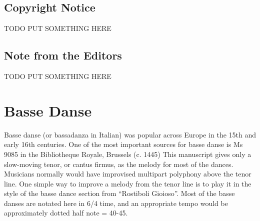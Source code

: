 \documentclass[11pt]{book}
\begin{document}
\frontmatter

\pagestyle{fancy}

\fancyhf{}

\fancyhead[LE,RO]{\thepage}
\renewcommand{\headrulewidth}{0pt}
\renewcommand{\footrulewidth}{0pt}
\setlength{\parindent}{0pt}

%
%
%
%
%
%

\section*{Copyright Notice}

TODO PUT SOMETHING HERE
\clearpage

\section*{Note from the Editors}

TODO PUT SOMETHING HERE

\begin{multicols}{2}

\renewcommand\cftchapafterpnum{\vskip\baselineskip}
\setlength{\cftsubsecindent}{0pt}
\setlength{\cftsubsecnumwidth}{0pt}
\tableofcontents
\end{multicols}

\clearpage
\mainmatter

\chapter{Basse Danse}

Basse danse (or bassadanza in Italian) was popular across Europe in the 15th
and early 16th centuries. One of the most important sources for basse danse is
Ms 9085 in the Bibliotheque Royale, Brussels (c. 1445) This manuscript gives
only a slow-moving tenor, or cantus firmus, as the melody for most of the
dances. Musicians normally would have improvised multipart polyphony above the
tenor line. One simple way to improve a melody from the tenor line is to play
it in the style of the basse dance section from ``Rostiboli Gioioso''.  Most of
the basse danses are notated here in 6/4 time, and an appropriate tempo would
be approximately dotted half note = 40-45.
\end{document}
